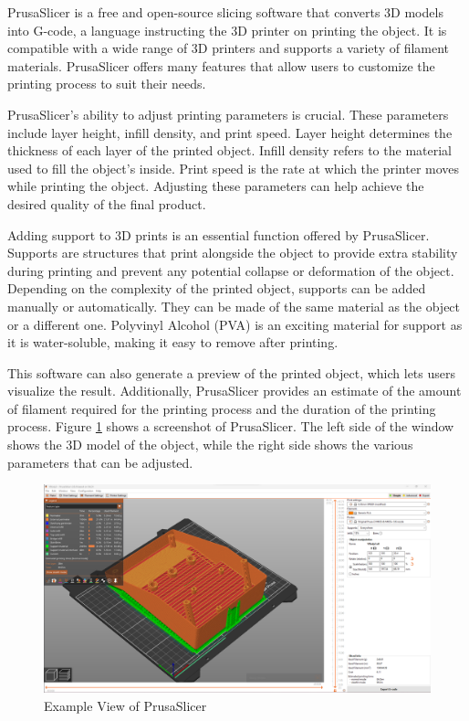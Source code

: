 PrusaSlicer is a free and open-source slicing software that converts 3D models into G-code, a language instructing the 3D printer on printing the object. It is compatible with a wide range of 3D printers and supports a variety of filament materials. PrusaSlicer offers many features that allow users to customize the printing process to suit their needs.

PrusaSlicer's ability to adjust printing parameters is crucial. These parameters include layer height, infill density, and print speed. Layer height determines the thickness of each layer of the printed object. Infill density refers to the material used to fill the object's inside. Print speed is the rate at which the printer moves while printing the object. Adjusting these parameters can help achieve the desired quality of the final product.

Adding support to 3D prints is an essential function offered by PrusaSlicer. Supports are structures that print alongside the object to provide extra stability during printing and prevent any potential collapse or deformation of the object. Depending on the complexity of the printed object, supports can be added manually or automatically. They can be made of the same material as the object or a different one. Polyvinyl Alcohol (PVA) is an exciting material for support as it is water-soluble, making it easy to remove after printing.

This software can also generate a preview of the printed object, which lets users visualize the result. Additionally, PrusaSlicer provides an estimate of the amount of filament required for the printing process and the duration of the printing process. Figure \ref{fig:prusa_slicer} shows a screenshot of PrusaSlicer. The left side of the window shows the 3D model of the object, while the right side shows the various parameters that can be adjusted.

\begin{figure}
    \centering
    \includegraphics[width=0.8\linewidth]{texs/Part1/chapter1/image/prusaslicer.png}
    \caption{Example View of PrusaSlicer}
    \label{fig:prusa_slicer}
\end{figure}


